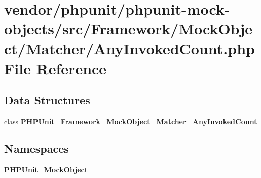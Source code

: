 \section{vendor/phpunit/phpunit-\/mock-\/objects/src/\+Framework/\+Mock\+Object/\+Matcher/\+Any\+Invoked\+Count.php File Reference}
\label{_any_invoked_count_8php}
\subsection*{Data Structures}
\begin{DoxyCompactItemize}
\item 
class {\bf P\+H\+P\+Unit\+\_\+\+Framework\+\_\+\+Mock\+Object\+\_\+\+Matcher\+\_\+\+Any\+Invoked\+Count}
\end{DoxyCompactItemize}
\subsection*{Namespaces}
\begin{DoxyCompactItemize}
\item 
 {\bf P\+H\+P\+Unit\+\_\+\+Mock\+Object}
\end{DoxyCompactItemize}
